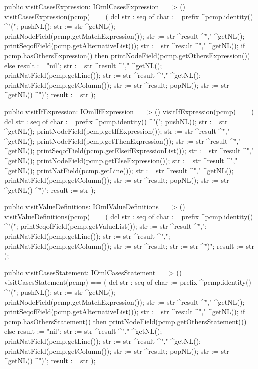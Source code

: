 \begin{vdm_al}
  public visitCasesExpression: IOmlCasesExpression ==> ()
  visitCasesExpression(pcmp) ==
    ( dcl str : seq of char := prefix ^pcmp.identity() ^"(";
      pushNL();
      str := str ^getNL();
      printNodeField(pcmp.getMatchExpression());
      str := str ^result ^"," ^getNL();
      printSeqofField(pcmp.getAlternativeList());
      str := str ^result ^"," ^getNL();
      if pcmp.hasOthersExpression()
      then printNodeField(pcmp.getOthersExpression())
      else result := "nil";
      str := str ^result ^"," ^getNL();
      printNatField(pcmp.getLine());
      str := str ^result ^"," ^getNL();
      printNatField(pcmp.getColumn());
      str := str ^result;
      popNL();
      str := str ^getNL() ^")";
      result := str );

  public visitIfExpression: IOmlIfExpression ==> ()
  visitIfExpression(pcmp) ==
    ( dcl str : seq of char := prefix ^pcmp.identity() ^"(";
      pushNL();
      str := str ^getNL();
      printNodeField(pcmp.getIfExpression());
      str := str ^result ^"," ^getNL();
      printNodeField(pcmp.getThenExpression());
      str := str ^result ^"," ^getNL();
      printSeqofField(pcmp.getElseifExpressionList());
      str := str ^result ^"," ^getNL();
      printNodeField(pcmp.getElseExpression());
      str := str ^result ^"," ^getNL();
      printNatField(pcmp.getLine());
      str := str ^result ^"," ^getNL();
      printNatField(pcmp.getColumn());
      str := str ^result;
      popNL();
      str := str ^getNL() ^")";
      result := str );

  public visitValueDefinitions: IOmlValueDefinitions ==> ()
  visitValueDefinitions(pcmp) ==
    ( dcl str : seq of char := prefix ^pcmp.identity() ^"(";
      printSeqofField(pcmp.getValueList());
      str := str ^result ^",";
      printNatField(pcmp.getLine());
      str := str ^result ^",";
      printNatField(pcmp.getColumn());
      str := str ^result;
      str := str ^")";
      result := str );

  public visitCasesStatement: IOmlCasesStatement ==> ()
  visitCasesStatement(pcmp) ==
    ( dcl str : seq of char := prefix ^pcmp.identity() ^"(";
      pushNL();
      str := str ^getNL();
      printNodeField(pcmp.getMatchExpression());
      str := str ^result ^"," ^getNL();
      printSeqofField(pcmp.getAlternativeList());
      str := str ^result ^"," ^getNL();
      if pcmp.hasOthersStatement()
      then printNodeField(pcmp.getOthersStatement())
      else result := "nil";
      str := str ^result ^"," ^getNL();
      printNatField(pcmp.getLine());
      str := str ^result ^"," ^getNL();
      printNatField(pcmp.getColumn());
      str := str ^result;
      popNL();
      str := str ^getNL() ^")";
      result := str );


\end{vdm_al}
